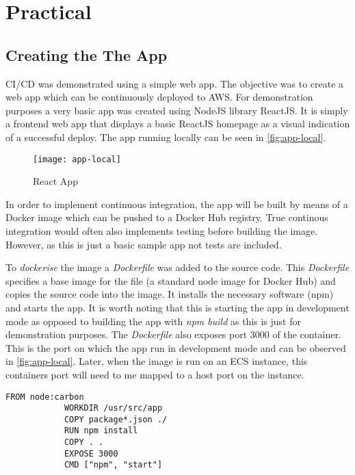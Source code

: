 \section{Practical}
	\subsection{Creating the The App}
	CI/CD was demonstrated using a simple web app. The objective was to create a web app which can be continuously deployed to AWS. For demonstration purposes a very basic app was created using NodeJS library ReactJS. It is simply a frontend web app that displays a basic ReactJS homepage as a visual indication of a successful deploy. The app running locally can be seen in \autoref{fig:app-local}.
	\begin{figure}[H]
		\caption{React App}
		\centering
		\texttt{[image: app-local]}
		\label{fig:app-local}
	\end{figure}
	In order to implement continuous integration, the app will be built by means of a Docker image which can be pushed to a Docker Hub registry. True continous integration would often also implements testing before building the image\citep{docker}. However, as this is just a basic sample app not tests are included.
	
	To \textit{dockerise} the image a \textit{Dockerfile} was added to the source code. This \textit{Dockerfile} specifies a base image for the file (a standard node image for Docker Hub) and copies the source code into the image. It installs the necessary software (npm) and starts the app. It is worth noting that this is starting the app in development mode as opposed to building the app with \textit{npm build} as this is just for demonstration purposes. The \textit{Dockerfile} also exposes port 3000 of the container. This is the port on which the app run in development mode and can be observed in \autoref{fig:app-local}. Later, when the image is run on an ECS instance, this containers port will need to me mapped to a host port on the instance.
	
	\begin{minipage}{\textwidth}
		\begin{lstlisting}[caption={Dockerfile}]
			FROM node:carbon
			WORKDIR /usr/src/app
			COPY package*.json ./
			RUN npm install
			COPY . .
			EXPOSE 3000
			CMD ["npm", "start"]
		\end{lstlisting}
	\end{minipage}
	
